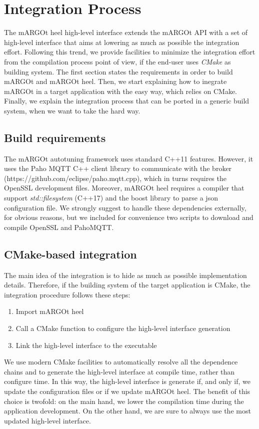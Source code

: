 \section{Integration Process}

The mARGOt heel high-level interface extends the mARGOt API with a set of high-level interface that aims at lowering as much as possible the integration effort.
Following this trend, we provide facilities to minimize the integration effort from the compilation process point of view, if the end-user uses \textit{CMake} as building system.
The first section states the requirements in order to build mARGOt and mARGOt heel.
Then, we start explaining how to inegrate mARGOt in a target application with the easy way, which relies on CMake.
Finally, we explain the integration process that can be ported in a generic build system, when we want to take the hard way.


\subsection{Build requirements}

The mARGOt autotuning framework uses standard C++11 features.
However, it uses the Paho MQTT C++ client library to communicate with the broker (https://github.com/eclipse/paho.mqtt.cpp), which in turns requires the OpenSSL development files.
Moreover, mARGOt heel requires a compiler that support \textit{std::filesystem} (C++17) and the boost library to parse a json configuration file.
We strongly suggest to handle these dependencies externally, for obvious reasons, but we included for convenience two scripts to download and compile OpenSSL and PahoMQTT.



\subsection{CMake-based integration}

The main idea of the integration is to hide as much as possible implementation details.
Therefore, if the building system of the target application is CMake, the integration procedure follows these steps:
\begin{enumerate}
	\item Import mARGOt heel
	\item Call a CMake function to configure the high-level interface generation
	\item Link the high-level interface to the executable
\end{enumerate}
We use modern CMake facilities to automatically resolve all the dependence chains and to generate the high-level interface at compile time, rather than configure time.
In this way, the high-level interface is generate if, and only if, we update the configuration files or if we update mARGOt heel.
The benefit of this choice is twofold: on the main hand, we lower the compilation time during the application development.
On the other hand, we are sure to always use the most updated high-level interface.

